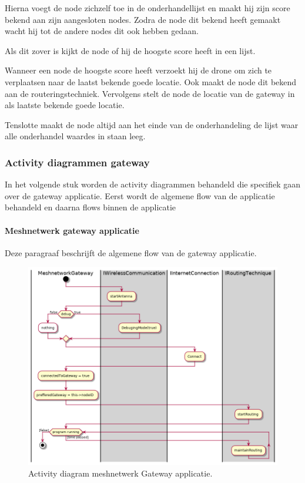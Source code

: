\documentclass[a4paper, 11pt, oneside]{report}
\begin{document}
Hierna voegt de node zichzelf toe in de onderhandellijst en maakt hij zijn score bekend aan zijn aangesloten nodes.
Zodra de node dit bekend heeft gemaakt wacht hij tot de andere nodes dit ook hebben gedaan.

Als dit zover is kijkt de node of hij de hoogste score heeft in een lijst.

Wanneer een node de hoogste score heeft verzoekt hij de drone om zich te verplaatsen naar de laatst bekende goede locatie. Ook maakt de node dit bekend aan de routeringstechniek. 
Vervolgens stelt de node de locatie van de gateway in als laatste bekende goede locatie.

Tenslotte maakt de node altijd aan het einde van de onderhandeling de lijst waar alle onderhandel waardes in staan leeg. 

\subsubsection{Activity diagrammen gateway}
\label{DetailedDesign:Communicatie:Activity:gateway}
In het volgende stuk worden de activity diagrammen behandeld die specifiek gaan over de gateway applicatie. Eerst wordt de algemene flow van de applicatie behandeld en daarna flows binnen de applicatie

\paragraph{Meshnetwerk gateway applicatie}
Deze paragraaf beschrijft de algemene flow van de gateway applicatie. 
\label{DetailedDesign:Communicatie:Activity:gateway:applicatie}
\begin{figure}[H]
	\begin{center}\includegraphics[width=.8\linewidth]{UML/out/Communication/activity/MeshGateway/MeshGateway.png}\end{center}
	\caption{Activity diagram meshnetwerk Gateway applicatie.}
	\label{fig:communication:activity:gateway}
\end{figure}
\end{document}
